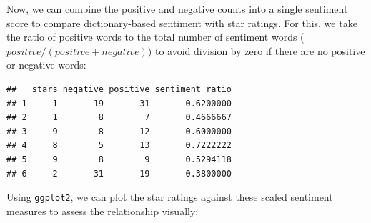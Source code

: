 \documentclass[
]{book}
\newenvironment{Shaded}{\begin{snugshade}}{\end{snugshade}}
\newcommand{\FunctionTok}[1]{\textcolor[rgb]{0.13,0.29,0.53}{\textbf{#1}}}
\newcommand{\NormalTok}[1]{#1}
\newcommand{\OtherTok}[1]{\textcolor[rgb]{0.56,0.35,0.01}{#1}}
\newcommand{\SpecialCharTok}[1]{\textcolor[rgb]{0.81,0.36,0.00}{\textbf{#1}}}
\begin{document}
Now, we can combine the positive and negative counts into a single sentiment score to compare dictionary-based sentiment with star ratings. For this, we take the ratio of positive words to the total number of sentiment words (\(positive / (positive + negative)\)) to avoid division by zero if there are no positive or negative words:

\begin{Shaded}
\end{Shaded}

\begin{verbatim}
##   stars negative positive sentiment_ratio
## 1     1       19       31       0.6200000
## 2     1        8        7       0.4666667
## 3     9        8       12       0.6000000
## 4     8        5       13       0.7222222
## 5     9        8        9       0.5294118
## 6     2       31       19       0.3800000
\end{verbatim}

Using \texttt{ggplot2}, we can plot the star ratings against these scaled sentiment measures to assess the relationship visually:
\end{document}
